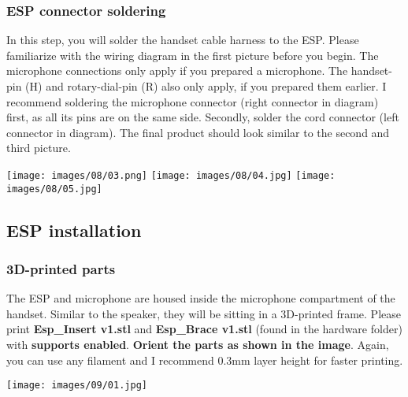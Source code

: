 \documentclass[]{article}
\begin{document}
\subsubsection{ESP connector soldering}
\begin{minipage}[t]{0.4\linewidth}
	\vspace{0pt}
	In this step, you will solder the handset cable harness to the ESP. Please familiarize with the wiring diagram in the first picture before you begin. The microphone connections only apply if you prepared a microphone. The handset-pin (H) and rotary-dial-pin (R) also only apply, if you prepared them earlier.
	\newline
	\newline
	I recommend soldering the microphone connector (right connector in diagram) first, as all its pins are on the same side. Secondly, solder the cord connector (left connector in diagram). The final product should look similar to the second and third picture.
\end{minipage}
\hfill
\begin{minipage}[t]{0.45\linewidth}
	\vspace{0pt}
	\texttt{[image: images/08/03.png]}
	\texttt{[image: images/08/04.jpg]}
	\texttt{[image: images/08/05.jpg]}
\end{minipage}





\subsection{ESP installation}
\subsubsection{3D-printed parts}
\begin{minipage}[t]{0.4\linewidth}
	\vspace{0pt}
	The ESP and microphone are housed inside the microphone compartment of the handset. Similar to the speaker, they will be sitting in a 3D-printed frame. Please print \textbf{Esp\_Insert v1.stl} and \textbf{Esp\_Brace v1.stl} (found in the hardware folder) with \textbf{supports enabled}. \textbf{Orient the parts as shown in the image}. Again, you can use any filament and I recommend 0.3mm layer height for faster printing.
\end{minipage}
\hfill
\begin{minipage}[t]{0.5\linewidth}
	\vspace{0pt}
	\texttt{[image: images/09/01.jpg]}
\end{minipage}
\end{document}
